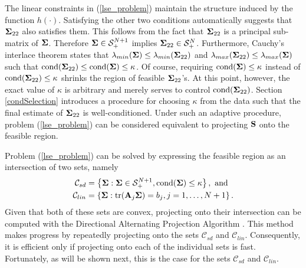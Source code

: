 \documentclass[11pt]{article}
\newcommand{\R}{\mathbb{R}}
\theoremstyle{definition}
\theoremstyle{definition}
\def\bSigma{{\bf \Sigma}}
\def\A{{\bf A}}
\def\SS{{\bf S}}
\def\cond{\text{cond}}
\def\Tr{\text{tr}}
\begin{document}
The linear constraints in (\ref{lse_problem}) maintain the structure induced by the function $h(\cdot)$. 
Satisfying the other two conditions automatically suggests that $\bSigma_{22}$ also satisfies them. This follows from the fact that $\bSigma_{22}$ is a principal sub-matrix of $\bSigma$. Therefore $\bSigma \in \mathcal{S}_{+}^{N+1}$ implies $\bSigma_{22} \in \mathcal{S}_{+}^{N}$. Furthermore, Cauchy's interlace theorem states that $\lambda_{min}(\bSigma) \leq \lambda_{min}(\bSigma_{22})$ and $\lambda_{max}(\bSigma_{22}) \leq \lambda_{max}(\bSigma)$ such that $\cond(\bSigma_{22}) \leq \cond(\bSigma) \leq \kappa$. Of course, requiring $\cond(\bSigma) \leq \kappa$ instead of $\cond(\bSigma_{22}) \leq \kappa$ shrinks the region of feasible $\bSigma_{22}$'s. 
 At this point, however, the exact value of $\kappa$ is arbitrary and merely serves to control $\cond(\bSigma_{22})$.  
 Section \ref{condSelection} introduces a procedure for choosing $\kappa$ from the data such that the final estimate of $\bSigma_{22}$ is well-conditioned. Under such an adaptive procedure, problem (\ref{lse_problem}) can be considered equivalent to projecting $\SS$ onto the feasible region. 



Problem (\ref{lse_problem}) can be solved by expressing  the feasible region as an intersection of two sets, namely 
\begin{align*}
\mathcal{C}_{sd} &= \left\{\bSigma : \bSigma \in \mathcal{S}_{+}^{N+1}, \cond(\bSigma) \leq \kappa\right\}, \text{ and }\\
\mathcal{C}_{lin} &= \left\{\bSigma : \Tr(\A_j \bSigma) = b_j, j = 1, \dots, N+1\right\}.
\end{align*}
Given that both of these sets are convex, projecting onto their intersection can be computed with the Directional Alternating Projection Algorithm \citep{gubin1967method}. This method makes progress by repeatedly projecting onto the sets $\mathcal{C}_{sd}$ and $\mathcal{C}_{lin}$. Consequently, it is efficient only if projecting onto each of the individual sets is fast. Fortunately, as will be shown next, this is the case for the sets $\mathcal{C}_{sd}$ and $\mathcal{C}_{lin}$. 
\end{document}
